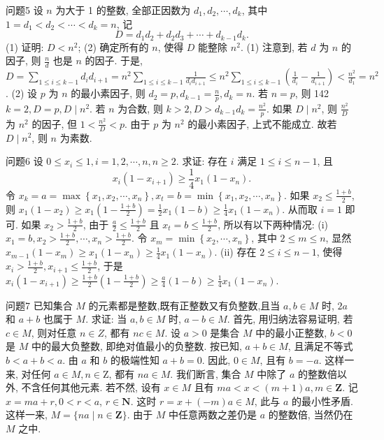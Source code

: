 问题5 设 $n$ 为大于 1 的整数, 全部正因数为 $d_1, d_2, \cdots, d_k$, 其中 $1=d_1<d_2<\cdots<d_k=n$, 记
$$
D=d_1 d_2+d_2 d_3+\cdots+d_{k-1} d_k .
$$
(1) 证明: $D<n^2$;
(2) 确定所有的 $n$, 使得 $D$ 能整除 $n^2$.
(1) 注意到, 若 $d$ 为 $n$ 的因子, 则 $\frac{n}{d}$ 也是 $n$ 的因子.
于是, $D= \sum_{1 \leqslant i \leqslant k-1} d_i d_{i+1}=n^2 \sum_{1 \leqslant i \leqslant k-1} \frac{1}{d_i d_{i+1}} \leqslant n^2 \sum_{1 \leqslant i \leqslant k-1}\left(\frac{1}{d_i}-\frac{1}{d_{i+1}}\right)<\frac{n^2}{d_1}=n^2$.
(2) 设 $p$ 为 $n$ 的最小素因子, 则 $d_2=p, d_{k-1}=\frac{n}{p}, d_k=n$. 若 $n=p$, 则 142 $k=2, D=p, D \mid n^2$. 若 $n$ 为合数, 则 $k>2, D>d_{k-1} d_k=\frac{n^2}{p}$. 如果 $D \mid n^2$, 则 $\frac{n^2}{D}$ 为 $n^2$ 的因子, 但 $1<\frac{n^2}{D}<p$. 由于 $p$ 为 $n^2$ 的最小素因子, 上式不能成立.
故若 $D \mid n^2$, 则 $n$ 为素数.



问题6 设 $0 \leqslant x_i \leqslant 1, i=1,2, \cdots, n, n \geqslant 2$. 求证: 存在 $i$ 满足 $1 \leqslant i \leqslant n-1$, 且
$$
x_i\left(1-x_{i+1}\right) \geqslant \frac{1}{4} x_1\left(1-x_n\right) .
$$
令 $x_k=a=\max \left\{x_1, x_2, \cdots, x_n\right\}, x_t=b=\min \left\{x_1, x_2, \cdots, x_n\right\}$.
如果 $x_2 \leqslant \frac{1+b}{2}$, 则 $x_1\left(1-x_2\right) \geqslant x_1\left(1-\frac{1+b}{2}\right)=\frac{1}{2} x_1(1-b) \geqslant \frac{1}{4} x_1\left(1-x_n\right)$. 从而取 $i=1$ 即可.
如果 $x_2>\frac{1+b}{2}$, 由于 $\frac{a}{2} \leqslant \frac{1+b}{2}$ 且 $x_t=b \leqslant \frac{1+b}{2}$, 所以有以下两种情况:
(i) $x_1=b, x_2>\frac{1+b}{2}, \cdots, x_n>\frac{1+b}{2}$. 令 $x_m=\min \left\{x_2, \cdots, x_n\right\}$, 其中 $2 \leqslant m \leqslant n$, 显然 $x_{m-1}\left(1-x_m\right) \geqslant x_1\left(1-x_n\right) \geqslant \frac{1}{4} x_1\left(1-x_n\right)$.
(ii) 存在 $2 \leqslant i \leqslant n-1$, 使得 $x_i>\frac{1+b}{2}, x_{i+1} \leqslant \frac{1+b}{2}$, 于是$x_i\left(1-x_{i+1}\right) \geqslant \frac{1+b}{2}\left(1-\frac{1+b}{2}\right) \geqslant \frac{a}{4}(1-b) \geqslant \frac{1}{4} x_1\left(1-x_n\right)$.



问题7 已知集合 $M$ 的元素都是整数,既有正整数又有负整数,且当 $a, b \in M$ 时, $2 a$ 和 $a+b$ 也属于 $M$. 求证: 当 $a, b \in M$ 时, $a-b \in M$.
首先, 用归纳法容易证明, 若 $c \in M$, 则对任意 $n \in Z$, 都有 $n c \in M$.
设 $a>0$ 是集合 $M$ 中的最小正整数, $b<0$ 是 $M$ 中的最大负整数, 即绝对值最小的负整数.
按已知, $a+b \in M$, 且满足不等式 $b<a+b<a$. 由 $a$ 和 $b$ 的极端性知 $a+b=0$. 因此, $0 \in M$, 且有 $b=-a$. 这样一来, 对任何 $a \in M, n \in \mathrm{Z}$, 都有 $n a \in M$.
我们断言, 集合 $M$ 中除了 $a$ 的整数倍以外, 不含任何其他元素.
若不然, 设有 $x \in M$ 且有 $m a<x<(m+1) a, m \in \mathbf{Z}$. 记 $x=m a+r, 0<r<a$, $r \in \mathbf{N}$. 这时 $r=x+(-m) a \in M$, 此与 $a$ 的最小性矛盾.
这样一来, $M=\{n a \mid n \in \mathbf{Z}\}$. 由于 $M$ 中任意两数之差仍是 $a$ 的整数倍, 当然仍在 $M$ 之中.



